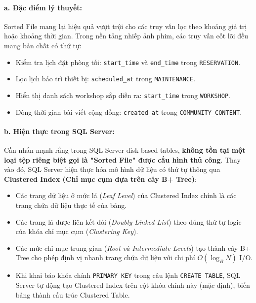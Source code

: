 \paragraph{a. Đặc điểm lý thuyết:}
Sorted File mang lại hiệu quả vượt trội cho các truy vấn lọc theo khoảng giá trị hoặc khoảng thời gian. Trong nền tảng nhiếp ảnh phim, các truy vấn cốt lõi đều mang bản chất có thứ tự:
\begin{itemize}
    \item Kiểm tra lịch đặt phòng tối: \texttt{start\_time} và \texttt{end\_time} trong \texttt{RESERVATION}.
    \item Lọc lịch bảo trì thiết bị: \texttt{scheduled\_at} trong \texttt{MAINTENANCE}.
    \item Hiển thị danh sách workshop sắp diễn ra: \texttt{start\_time} trong \texttt{WORKSHOP}.
    \item Dòng thời gian bài viết cộng đồng: \texttt{created\_at} trong \texttt{COMMUNITY\_CONTENT}.
\end{itemize}

\paragraph{b. Hiện thực trong SQL Server:}
Cần nhấn mạnh rằng trong SQL Server disk-based tables, \textbf{không tồn tại một loại tệp riêng biệt gọi là "Sorted File" được cấu hình thủ công}. Thay vào đó, SQL Server hiện thực hóa mô hình dữ liệu có thứ tự thông qua \textbf{Clustered Index (Chỉ mục cụm dựa trên cây B+ Tree)}:
\begin{itemize}
    \item Các trang dữ liệu ở mức lá (\textit{Leaf Level}) của Clustered Index chính là các trang chứa dữ liệu thực tế của bảng.
    \item Các trang lá được liên kết đôi (\textit{Doubly Linked List}) theo đúng thứ tự logic của khóa chỉ mục cụm (\textit{Clustering Key}).
    \item Các mức chỉ mục trung gian (\textit{Root và Intermediate Levels}) tạo thành cây B+ Tree cho phép định vị nhanh trang chứa dữ liệu với chi phí $O(\log_B N)$ I/O.
    \item Khi khai báo khóa chính \texttt{PRIMARY KEY} trong câu lệnh \texttt{CREATE TABLE}, SQL Server tự động tạo Clustered Index trên cột khóa chính này (mặc định), biến bảng thành cấu trúc Clustered Table.
\end{itemize}

